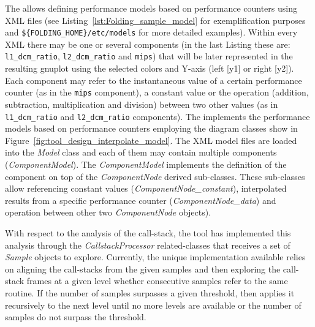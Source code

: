 The \FOLDING allows defining performance models based on performance counters using XML files (see Listing~\ref{lst:Folding_sample_model} for exemplification purposes and \texttt{\$\{FOLDING\_HOME\}/etc/models} for more detailed examples).
Within every XML there may be one or several components (in the last Listing these are: \texttt{l1\_dcm\_ratio}, \texttt{l2\_dcm\_ratio} and \texttt{mips}) that will be later represented in the resulting gnuplot using the selected colors and Y-axis (left [y1] or right [y2]).
Each component may refer to the instantaneous value of a certain performance counter (as in the \texttt{mips} component), a constant value or the operation (addition, subtraction, multiplication and division) between two other values (as in \texttt{l1\_dcm\_ratio} and \texttt{l2\_dcm\_ratio} components).
The \FOLDING implements the performance models based on performance counters employing the diagram classes show in Figure~\ref{fig:tool_design_interpolate_model}.
The XML model files are loaded into the \textsl{Model} class and each of them may contain multiple components (\textsl{ComponentModel}).
The \textsl{ComponentModel} implements the definition of the component on top of the \textsl{ComponentNode} derived sub-classes.
These sub-classes allow referencing constant values (\textsl{ComponentNode\_constant}), interpolated results from a specific performance counter (\textsl{ComponentNode\_data}) and operation between other two \textsl{ComponentNode} objects).



With respect to the analysis of the call-stack, the \FOLDING tool has implemented this analysis through the \textsl{CallstackProcessor} related-classes that receives a set of \textsl{Sample} objects to explore.
Currently, the unique implementation available relies on aligning the call-stacks from the given samples and then exploring the call-stack frames at a given level whether consecutive samples refer to the same routine.
If the number of samples surpasses a given threshold, then applies it recursively to the next level until no more levels are available or the number of samples do not surpass the threshold.
